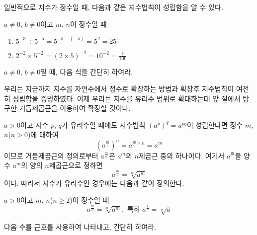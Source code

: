 \documentclass[11pt, a4paper]{book}
\begin{document}
일반적으로 지수가 정수일 때, 다음과 같은 지수법칙이 성립함을 알 수 있다.
\begin{theorem}
	$a\ne0$, $b\ne0$이고 $m$, $n$이 정수일 때
\end{theorem}

\begin{sample}
	\begin{enumerate}[label = (\arabic*)]
		\item $5^{-3}\div  5^{-5}=5^{-3-(-5)}=5^{2}=25$
		\item $2^{-2}\times 5^{-2}=(2\times 5)^{-2}=10^{-2}=\frac{1}{100}$
	\end{enumerate}
\end{sample}
\begin{problem}
	$a\ne0$, $b\ne0$일 때, 다음 식을 간단히 하여라.
	
\end{problem}


우리는 지금까지 지수를 자연수에서 정수로 확장하는 방법과 확장후 지수법칙이 여전히 성립함을 증명하였다. 이제 우리는 지수를 유리수 범위로 확대하는데 앞 절에서 탐구한
거듭제곱근을 이용하여 확장할 것이다.

$a>0$이고 지수 $p$, $q$가 유리수일 때에도 지수법칙 $(a^{p})^{q}=a^{pq}$이 성립한다면 정수 $m$, $n$($n>0$)에 대하여
\[
\left(a^{\frac{m}{n}}\right)^{n}= a^{\frac{m}{n}\times n}= a^{m}
\]
이므로 거듭제곱근의 정의로부터 $a^{\frac{m}{n}}$은 $a^{m}$의 $n$제곱근 중의 하나이다.
여기서 $a^{\frac{m}{n}}$을 양수 $a^{m}$의 양의 $n$제곱근으로 정하면
\[
a^{\frac{m}{n}}=\sqrt[n]{a^{m}}
\]
이다. 따라서 지수가 유리수인 경우에는 다음과 같이 정의한다.
\begin{theorem}[유리수인 지수]
	$a>0$이고 $m$, $n$($n \geq 2$)이 정수일 때
	\[
	a^{\frac{m}{n}}=\sqrt[n]{a^{m}}, \text{ 특히 } a^{\frac{1}{n}}=\sqrt[n]{a}
	\]
\end{theorem}

\begin{sample}
\end{sample}

\begin{problem}
	다음 수를 근호를 사용하여 나타내고, 간단히 하여라.
\end{problem}
\end{document}
